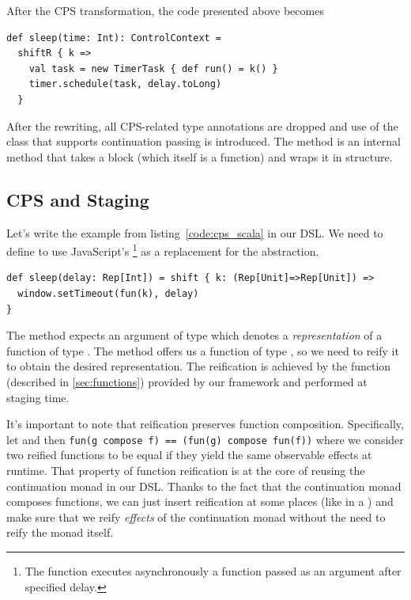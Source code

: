 \documentclass[runningheads,a4paper]{llncs}
\begin{document}
After the CPS transformation, the code presented above becomes
\begin{lstlisting}
def sleep(time: Int): ControlContext =
  shiftR { k =>
    val task = new TimerTask { def run() = k() }
    timer.schedule(task, delay.toLong)
  }
\end{lstlisting}

After the rewriting, all CPS-related type annotations are dropped and use of the  class that supports continuation passing is introduced. The  method is an internal method that takes a block (which itself is a function) and wraps it in  structure.

\subsection{CPS and Staging}
Let's write the example from listing~\ref{code:cps_scala} in our DSL. We need to define  to use JavaScript's 
\footnote{The  function executes asynchronously a function passed as an argument after specified delay.}
as a replacement for the  abstraction.
\begin{lstlisting}
def sleep(delay: Rep[Int]) = shift { k: (Rep[Unit]=>Rep[Unit]) =>
  window.setTimeout(fun(k), delay)
}
\end{lstlisting}

The  method expects an argument of type  which denotes a \emph{representation} of a function of type . The  method offers us a function of type , so we need to reify it to obtain the desired representation. The reification is achieved by the  function (described in \ref{sec:functions}) provided by our framework and performed at staging time.

It's important to note that reification preserves function composition. Specifically, let  and  then {\tt\small fun(g compose f) == (fun(g) compose fun(f))} where we consider two reified functions to be equal if they yield the same observable effects at runtime. That property of function reification is at the core of reusing the continuation monad in our DSL. Thanks to the fact that the continuation monad composes functions, we can just insert reification at some places (like in a ) and make sure that we reify \emph{effects} of the continuation monad without the need to reify the monad itself.
\end{document}
